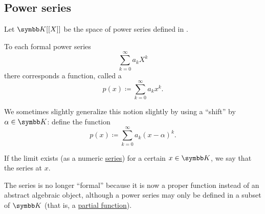 \subsection{Power series}\label{subsec:power_series}

\begin{definition}\label{def:convergent_power_series}
  Let \( \BK[[X]] \) be the space of power series defined in .

  To each formal power series
  \begin{equation*}
    \sum_{k=0}^\infty a_k X^k
  \end{equation*}
  there corresponds a function, called a 
  \begin{equation}\label{def:convergent_power_series/series}
    p(x) \coloneqq \sum_{k=0}^\infty a_k x^k.
  \end{equation}

  We sometimes slightly generalize this notion slightly by using a \enquote{shift} by \( \alpha \in \BK \): define the function
  \begin{equation}\label{def:convergent_power_series/shifted_series}
    p(x) \coloneqq \sum_{k=0}^\infty a_k (x - \alpha)^k.
  \end{equation}

  If the limit exists (as a numeric \hyperref[def:convergent_series]{series}) for a certain \( x \in \BK \), we say that the series  at \( x \).

  The series is no longer \enquote{formal} because it is now a proper function instead of an abstract algebraic object, although a power series may only be defined in a subset of \( \BK \) (that is, a \hyperref[def:function/partial]{partial function}).
\end{definition}

